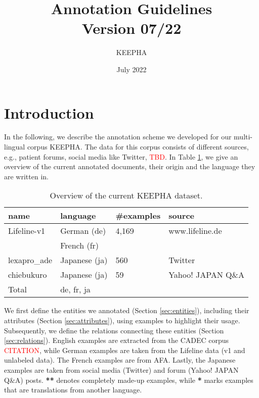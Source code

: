 \documentclass[12pt]{article}
\title{Annotation Guidelines\\ Version 07/22}
\author{KEEPHA}
\date{July 2022}
\theoremstyle{definition}
\begin{document}
\maketitle

\tableofcontents
\clearpage

\section{Introduction}
In the following, we describe the annotation scheme we developed for our multi-lingual corpus KEEPHA.
The data for this corpus consists of different sources, e.g., patient forums, social media like Twitter, \textcolor{red}{TBD}.
In Table \ref{tab:data}, we give an overview of the current annotated documents, their origin and the language they are written in.

\begin{table}[h]
\centering
\begin{tabular}{@{}llll@{}}
\toprule
\textbf{name}   & {\textbf{language}}   & \textbf{\#examples}   & \textbf{source} \\ \midrule

Lifeline-v1     &  German (de)          & 4,169                 &  www.lifeline.de \\ 

                & French (fr)           &                       &                   \\
lexapro\_ade    & Japanese (ja)         & 560                   & Twitter                  \\
chiebukuro & Japanese (ja) & 59 & Yahoo! JAPAN Q\&A\\
\midrule

Total           & de, fr, ja            &                       & \\

\bottomrule
\end{tabular}
\caption{Overview of the current KEEPHA dataset.}
\label{tab:data}
\end{table}


\noindent We first define the entities we annotated (Section \ref{sec:entities}), including their attributes (Section \ref{sec:attributes}), using examples to highlight their usage.
Subsequently, we define the relations connecting these entities (Section \ref{sec:relations}).
English examples are extracted from the CADEC corpus \textcolor{red}{CITATION}, while German examples are taken from the Lifeline data (v1 and unlabeled data).
The French examples are from AFA.
Lastly, the Japanese examples are taken from social media (Twitter) and forum (Yahoo! JAPAN Q\&A) posts.
\textbf{**} denotes completely made-up examples, while \textbf{*} marks examples that are translations from another language. 
\end{document}

